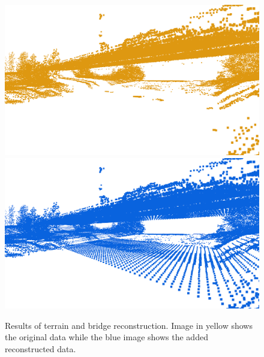 \documentclass{egpubl-eurovis-star}
\begin{document}
\begin{figure}[ht]
    \centering
    \includegraphics[width=1\columnwidth]{side_pre_3.png}
    \includegraphics[width=1\columnwidth]{side_br_3.png}
    \caption{Results of terrain and bridge reconstruction. Image in yellow shows the original data while the blue image shows the added reconstructed data.}
    \label{fig3}
\end{figure}
\end{document}
